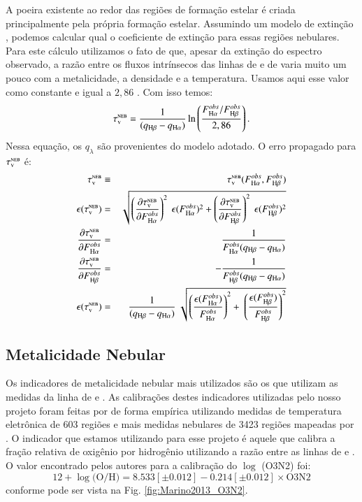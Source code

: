 A poeira existente ao redor das regiões de formação estelar é criada principalmente pela própria
formação estelar. Assumindo um modelo de extinção \citep[neste trabalho assumimos][]{CCM1989a},
podemos calcular qual o coeficiente de extinção para essas regiões nebulares. Para este cálculo
utilizamos o fato de que, apesar da extinção do espectro observado, a razão entre os fluxos
intrínsecos das linhas de \Halpha e de \Hbeta varia muito um pouco com a metalicidade, a densidade
e a temperatura. Usamos aqui esse valor como constante e igual a $2,86$
\citep{Osterbrock.Ferland.2006a}. Com isso temos:
\begin{equation}
	\tauVN = \frac{1}{(q_{\Hbeta} - q_{\Halpha})} \ln \left( \frac{F_{\Halpha}^{obs}/F_{\Hbeta}^{obs}}{2,86} \right).
\end{equation}
\noindent Nessa equação, os $q_\lambda$ são provenientes do modelo adotado. O erro propagado para
$\tau_{\mathrm{\textsc{v}}}^{\mathrm{\textsc{neb}}}$ é:
\begin{eqnarray}
	\tauVN &\equiv& \tauVN(F_{\Halpha}^{obs}, F_{\Hbeta}^{obs}) \\
	\epsilon (\tauVN) &=& \sqrt{\left(\del{\tauVN}{F_{\Halpha}^{obs}}\right)^2 \
\epsilon (F_{\Halpha}^{obs})^2 + \left(\del{\tauVN}{F_{\Hbeta}^{obs}}\right)^2 \
\epsilon (F_{\Hbeta}^{obs})^2 } \\
	\del{\tauVN}{F_{\Halpha}^{obs}} &=& \frac{1}{F_{\Halpha}^{obs} (q_{\Hbeta} - q_{\Halpha})} \\
	\del{\tauVN}{F_{\Hbeta}^{obs}} &=& - \frac{1}{F_{\Hbeta}^{obs} (q_{\Hbeta} - q_{\Halpha})} \\
	\epsilon (\tauVN) &=& \frac{1}{(q_{\Hbeta} - q_{\Halpha})} \
\sqrt{\left(\frac{\epsilon (F_{\Halpha}^{obs})}{F_{\Halpha}^{obs}}\right)^2 + \
\left(\frac{\epsilon (F_{\Hbeta}^{obs})}{F_{\Hbeta}^{obs}}\right)^2 }
\end{eqnarray}

\subsection{Metalicidade Nebular}
\label{sec:emline:datacube:Zneb}

Os indicadores de metalicidade nebular mais utilizados são os que utilizam as medidas da linha de
\OIII e \NII. As calibrações destes indicadores utilizadas pelo nosso projeto foram feitas por
\citet{Marino.etal.2013a} de forma empírica utilizando medidas de temperatura eletrônica de 603
regiões \Hii e mais medidas nebulares de 3423 regiões \Hii mapeadas por \citet{Sanchez.etal.2013a}.
O indicador que estamos utilizando para esse projeto é aquele que calibra a fração relativa de
oxigênio por hidrogênio utilizando a razão entre as linhas de \oIII e \nII. O valor encontrado pelos
autores para a calibração do $\log$ (O3N2) foi:
\begin{equation}
	12 + \log \textrm{(O/H)} = 8.533[\pm0.012] - 0.214[\pm0.012]\times \textrm{O3N2}
\end{equation}
\noindent conforme pode ser vista na Fig. \ref{fig:Marino2013_O3N2}.

